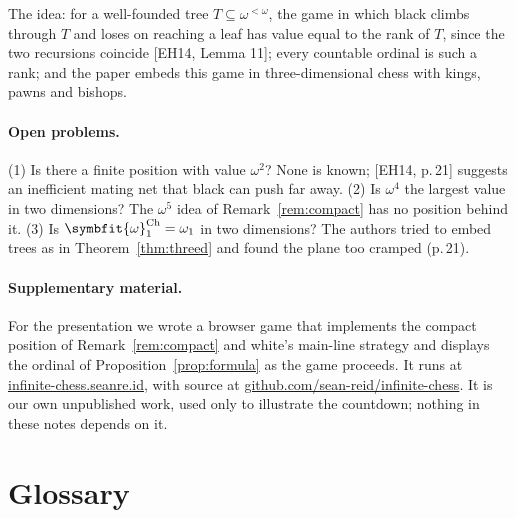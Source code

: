 \documentclass[10pt]{article}
\theoremstyle{notes}
\newcommand{\EH}[1]{[EH14, #1]}
\newcommand{\bomega}{\symbfit{\omega}}
\newcommand{\Ch}{\mathrm{Ch}}
\begin{document}
The idea: for a well-founded tree $T\subseteq\omega^{<\omega}$, the game in which black climbs through $T$
and loses on reaching a leaf has value equal to the rank of $T$, since the two recursions coincide
\EH{Lemma 11}; every countable ordinal is such a rank; and the paper embeds this game in three-dimensional chess
with kings, pawns and bishops.

\paragraph{Open problems.}
(1) Is there a finite position with value $\omega^2$? None is known; [EH14, p.\,21] suggests an inefficient
mating net that black can push far away. (2) Is $\omega^4$ the largest value in two dimensions? The
$\omega^5$ idea of Remark~\ref{rem:compact} has no position behind it. (3) Is $\bomega_1^{\Ch}=\omega_1$
in two dimensions? The authors tried to embed trees as in Theorem~\ref{thm:threed} and found the plane too cramped
(p.\,21).

\paragraph{Supplementary material.}
For the presentation we wrote a browser game that implements the compact position of
Remark~\ref{rem:compact} and white's main-line strategy and displays the ordinal of
Proposition~\ref{prop:formula} as the game proceeds. It runs at \href{https://infinite-chess.seanre.id}{infinite-chess.seanre.id}, with source at
\href{https://github.com/sean-reid/infinite-chess}{github.com/sean-reid/infinite-chess}. It is our own unpublished work, used only
to illustrate the countdown; nothing in these notes depends on it.

\section*{Glossary}
\end{document}
